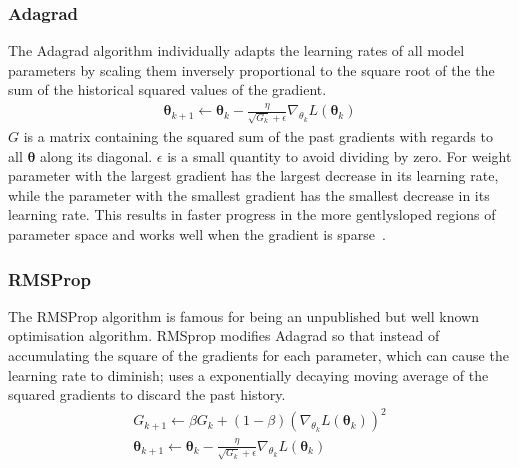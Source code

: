 \documentclass[11pt]{article}
\begin{document}
    \subsubsection{Adagrad}
    The Adagrad algorithm individually adapts the learning rates of all model parameters by scaling them inversely
    proportional to the square root of the the sum of the historical squared values of the gradient.
    \begin{align*}
        \pmb\theta_{k+1} \gets \pmb\theta_{k} - \frac{\eta}{  \sqrt{G_{k}} + \epsilon } \nabla_{\theta_k} L( \pmb\theta_k)
    \end{align*}
    $G$ is a matrix containing the squared sum of the past gradients with regards to all $\pmb\theta$ along its diagonal.
    $\epsilon$ is a small quantity to avoid dividing by zero.
    For weight parameter with the largest gradient has the largest decrease in its learning rate, while the parameter
    with the smallest gradient has the smallest decrease in its learning rate.
    This results in faster progress in the more gentlysloped regions of parameter space and works well when the
    gradient is sparse~\cite{duchi2011adaptive}.


    \subsubsection{RMSProp}
    The RMSProp algorithm is famous for being an unpublished but well known optimisation algorithm.
    RMSprop modifies Adagrad so that instead of accumulating the square of the gradients for each parameter, which can
    cause the learning rate to diminish; uses a exponentially decaying moving average of the squared gradients to
    discard the past history.
    \begin{align*}
        G_{k+1} \gets \beta G_{k} + (1 - \beta) ( \nabla_{\theta_k} L (\pmb\theta_k) )^2\\
        \pmb\theta_{k+1} \gets \pmb\theta_{k} - \frac{\eta}{  \sqrt{G_{k}} + \epsilon } \nabla_{\theta_k} L( \pmb\theta_k)
    \end{align*}
\end{document}
